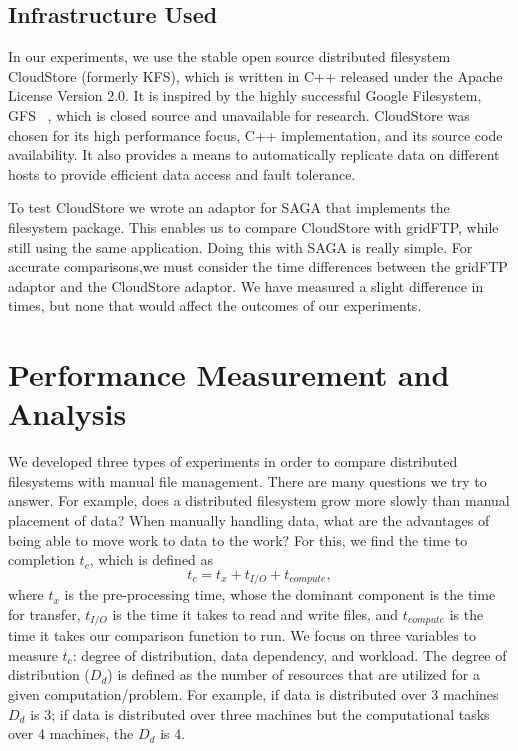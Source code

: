 \documentclass{rspublic}
\newcommand{\micnote}[1]{ {\textcolor{blue} { ***Michael: #1 }}}
\newcommand{\betynote}[1]{ {\textcolor{orange} { ***Bety: #1 }}}
\newcommand{\jhanote}[1]{} \newcommand{\micnote}[1]{}\newcommand{\betynote}[1]{} \newcommand{\fixme}[1]{}
\begin{document}

\subsection{Infrastructure Used}

In our experiments, we use the stable open source distributed
filesystem CloudStore (formerly KFS), which is written in C++ released
under the Apache License Version 2.0. It is inspired by the highly
successful Google Filesystem, GFS ~\citep{cloudstore_web}, which is
closed source and unavailable for research. CloudStore was chosen for
its high performance focus, C++ implementation, and its source code
availability. It also provides a means to automatically replicate data
on different hosts to provide efficient data access and fault
tolerance.

To test CloudStore we wrote an adaptor for SAGA that implements the
filesystem package.  This enables us to compare CloudStore with gridFTP,
while still using the same application.  Doing this with SAGA is really
simple.  For accurate comparisons,we must consider the time differences
between the gridFTP adaptor and the CloudStore adaptor.  We have
measured a slight difference in times, but none that would affect the
outcomes of our experiments.  

\section{Performance Measurement and Analysis} We developed three types
of experiments in order to compare distributed filesystems with manual
file management. There are many questions we try to answer.  For
example, does a distributed filesystem grow more slowly than manual
placement of data?  When manually handling data, what are the advantages
of being able to move work to data to the work? For this, we find the
time to completion $t_c$, which is defined as
 \begin{equation}
t_c = t_x + t_{I/O} + t_{compute},
\end{equation}
where $t_x$ is the pre-processing time, whose the dominant component is
the time for transfer, $t_{I/O}$ is the time it takes to read and write
files, and $t_{compute}$ is the time it takes our comparison function to
run.  We focus on three variables to measure $t_c$: degree of
distribution, data dependency, and workload. The degree of distribution
($D_d$) is defined as the number of resources that are utilized for a
given computation/problem. For example, if data is distributed over 3
machines $D_d$ is 3; if data is distributed over three machines but the
computational tasks over 4 machines, the $D_d$ is 4.
\end{document}
